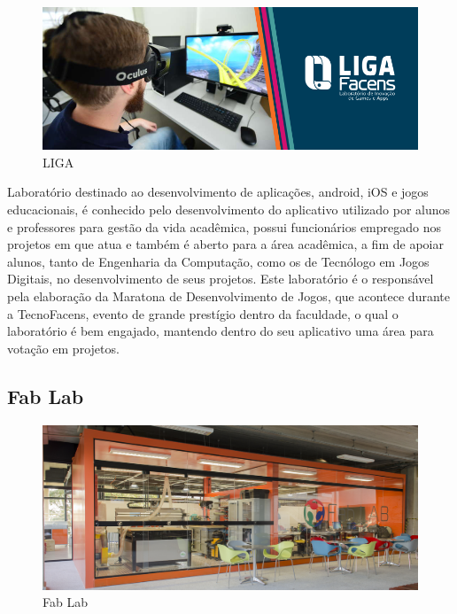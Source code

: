 \documentclass[
	12pt,				%
	oneside,			%
	a4paper,			%
	chapter=TITLE,		%
	section=TITLE,		%
	sumario=tradicional %
	english,			%
	french,				%
	spanish,			%
	brazil				%
	]{abntex2}
\begin{document}
\begin{figure}[htb]
	\caption{\label{fig:liga} LIGA}
	\begin{center}
		\includegraphics[scale=0.5]{liga}
	\end{center}
\end{figure}

Laboratório destinado ao desenvolvimento de aplicações, android, iOS e jogos educacionais, é conhecido pelo desenvolvimento do aplicativo utilizado por alunos e professores para gestão da vida acadêmica, possui funcionários empregado nos projetos em que atua e também é aberto para a área acadêmica, a fim de apoiar alunos, tanto de Engenharia da Computação, como os de Tecnólogo em Jogos Digitais, no desenvolvimento de seus projetos. Este laboratório é o responsável pela elaboração da Maratona de Desenvolvimento de Jogos, que acontece durante a TecnoFacens, evento de grande prestígio dentro da faculdade, o qual o laboratório é bem engajado, mantendo dentro do seu aplicativo uma área para votação em projetos.

\subsection{Fab Lab}

\begin{figure}[htb]
	\caption{\label{fig:fablab} Fab Lab}
	\begin{center}
		\includegraphics[scale=0.7]{fablab}
	\end{center}
\end{figure}
\end{document}
